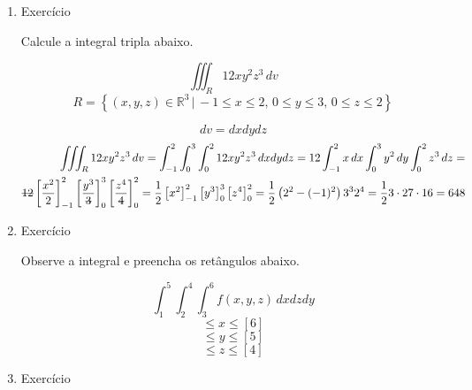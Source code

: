 \begin{enumerate}
	\item Exercício
	
	Calcule a integral tripla abaixo.
	
	\begin{equation*}
		\iiint_R 12xy^2z^3\,dv
	\end{equation*}
	\begin{equation*}
		R = \left\{(x, y, z) \in \mathbb{R}^3 \,|\, -1 \leq x \leq 2,\, 0 \leq y \leq 3,\, 0 \leq z \leq 2\right\}
	\end{equation*}
	
	\begin{equation*}
		dv = dxdydz
	\end{equation*}
	\begin{align*}
		\iiint_R 12xy^2z^3\,dv = \int_{-1}^2 \int_0^3 \int_0^2 12xy^2z^3\, dxdydz = 12\int_{-1}^2 x\, dx \int_0^3 y^2\, dy \int_0^2 z^3\, dz =\\ {\overstrike{12}}\left[\dfrac{x^2}{2}\right]_{-1}^2 \left[\dfrac{y^3}{\overstrike{3}}\right]_0^3 \left[\dfrac{z^4}{\overstrike{4}}\right]_0^2 = \dfrac{1}{2}\left[x^2\right]_{-1}^2 \left[y^3\right]_0^3 \left[z^4\right]_0^2 = \dfrac{1}{2}\left(2^2 - (-1)^2\right)3^3 2^4 = \dfrac{1}{2}3\cdot27\cdot16 = 648
	\end{align*}
	
	\item Exercício
	
	Observe a integral e preencha os retângulos abaixo.
	
	\begin{equation*}
		\int_1^5 \int_2^4 \int_3^6 f(x,y,z)\, dxdzdy	
	\end{equation*}
	\begin{equation*}
		[3] \leq x \leq [6]
	\end{equation*}
	\begin{equation*}
		[1] \leq y \leq [5]
	\end{equation*}
	\begin{equation*}
		[2] \leq z \leq [4]
	\end{equation*}
	
	\item Exercício
	

\end{enumerate}
